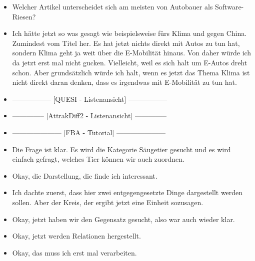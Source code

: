 {\begin{itemize}[]
              Also bei Software-Riesen: Das hört man natürlich immer im Zusammenhang mit Tesla.
              Ich habe jetzt irgendwas im Zusammenhang mit Autobauer und Riese gesucht, aber das sehe ich jetzt hier nicht.
              Das wäre mir nämlich als Erstes in den Sinn gekommen.
              Halt einfach ein großer Autobauer.
              Aber zweite Gedanke wäre dann halt alles, was irgendwie mit Tesla zu tun hat wegen Software wie.
              Vielleicht aus dem Gefühl heraus \flqq Auto-Bloggerin nimmt Tesla-Modell auseinander\frqq{}.
              Einfach, weil es da wahrscheinlich sehr viel um Software gehen wird und um den Autobauer an sich.
        \item {} Welcher Artikel unterscheidet sich am meisten von \flqq Autobauer als Software-Riesen\frqq{}?
        \item {} Ich hätte jetzt so was gesagt wie beispielsweise \flqq fürs Klima und gegen China\frqq{}.
              Zumindest vom Titel her.
              Es hat jetzt nichts direkt mit Autos zu tun hat, sondern Klima geht ja weit über die E-Mobilität hinaus.
              Von daher würde ich da jetzt erst mal nicht gucken.
              Vielleicht, weil es sich halt um E-Autos dreht schon.
              Aber grundsätzlich würde ich halt, wenn es jetzt das Thema Klima ist nicht direkt daran denken, dass es irgendwas mit E-Mobilität zu tun hat.
        \item {-----------------} [QUESI - Listenansicht] {-----------------}
        \item {--------------} [AttrakDiff2 - Listenansicht] {--------------}
        \item {---------------------} [FBA - Tutorial] {---------------------}
        \item {} Die Frage ist klar.
              Es wird die Kategorie Säugetier gesucht und es wird einfach gefragt, welches Tier können wir auch zuordnen.
        \item {} Okay, die Darstellung, die finde ich interessant.
        \item {} Ich dachte zuerst, dass hier zwei entgegengesetzte Dinge dargestellt werden sollen. Aber der Kreis, der ergibt jetzt eine Einheit sozusagen.
        \item {} Okay, jetzt haben wir den Gegensatz gesucht, also war auch wieder klar.
        \item {} Okay, jetzt werden Relationen hergestellt.
        \item {} Okay, das muss ich erst mal verarbeiten.

\end{itemize}}
